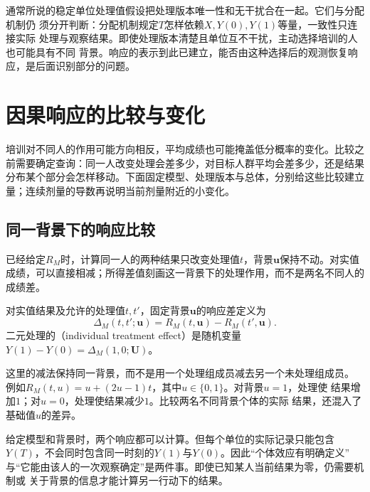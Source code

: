 通常所说的稳定单位处理值假设把处理版本唯一性和无干扰合在一起。它们与分配机制仍
须分开判断：分配机制规定\(T\)怎样依赖\(X,Y(0),Y(1)\)等量，一致性只连接实际
处理与观察结果。即使处理版本清楚且单位互不干扰，主动选择培训的人也可能具有不同
背景。响应的表示到此已建立，能否由这种选择后的观测恢复响应，是后面识别部分的问题。

\section{因果响应的比较与变化}
\label{sec:causal-response-comparison}

培训对不同人的作用可能方向相反，平均成绩也可能掩盖低分概率的变化。比较之前需要确定查询：同一人改变处理会差多少，对目标人群平均会差多少，还是结果分布某个部分会怎样移动。下面固定模型、处理版本与总体，分别给这些比较建立量；连续剂量的导数再说明当前剂量附近的小变化。

\subsection{同一背景下的响应比较}
\label{sec:causal-individual-response}

已经给定\(R_M\)时，计算同一人的两种结果只改变处理值\(t\)，背景\(\bm u\)保持不动。对实值成绩，可以直接相减；所得差值刻画这一背景下的处理作用，而不是两名不同人的成绩差。

\begin{definition}[同一背景下的响应差]
  \label{def:causal-individual-effect}
  对实值结果及允许的处理值\(t,t'\)，固定背景\(\bm u\)的响应差定义为
  \begin{equation}
    \Delta_M(t,t';\bm u)=R_M(t,\bm u)-R_M(t',\bm u).
    \label{eq:causal-individual-response-difference}
  \end{equation}
  二元处理的（individual treatment effect）是随机变量
  \(Y(1)-Y(0)=\Delta_M(1,0;\bm U)\)。
\end{definition}

这里的减法保持同一背景，而不是用一个处理组成员减去另一个未处理组成员。
例如\(R_M(t,u)=u+(2u-1)t\)，其中\(u\in\{0,1\}\)。对背景\(u=1\)，处理使
结果增加\(1\)；对\(u=0\)，处理使结果减少\(1\)。比较两名不同背景个体的实际
结果，还混入了基础值\(u\)的差异。

给定模型和背景时，两个响应都可以计算。但每个单位的实际记录只能包含
\(Y(T)\)，不会同时包含同一时刻的\(Y(1)\)与\(Y(0)\)。因此“个体效应有明确定义”
与“它能由该人的一次观察确定”是两件事。即使已知某人当前结果为零，仍需要机制或
关于背景的信息才能计算另一行动下的结果。

